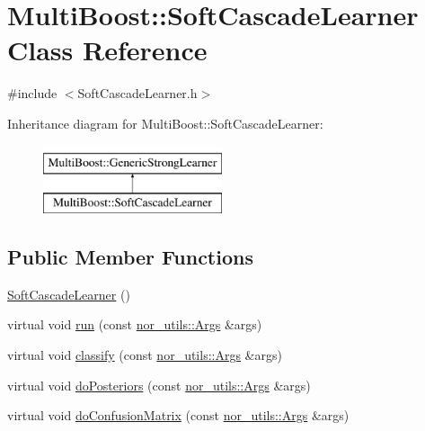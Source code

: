 \hypertarget{classMultiBoost_1_1SoftCascadeLearner}{\section{Multi\-Boost\-:\-:Soft\-Cascade\-Learner Class Reference}
\label{classMultiBoost_1_1SoftCascadeLearner}
}


{\ttfamily \#include $<$Soft\-Cascade\-Learner.\-h$>$}

Inheritance diagram for Multi\-Boost\-:\-:Soft\-Cascade\-Learner\-:\begin{figure}[H]
\begin{center}
\leavevmode
\includegraphics[height=2.000000cm]{classMultiBoost_1_1SoftCascadeLearner}
\end{center}
\end{figure}
\subsection*{Public Member Functions}
\begin{DoxyCompactItemize}
\item 
\hyperlink{classMultiBoost_1_1SoftCascadeLearner_a5ca76868ff190a12fc3289d1882bcf2f}{Soft\-Cascade\-Learner} ()
\item 
virtual void \hyperlink{classMultiBoost_1_1SoftCascadeLearner_aa6fbd04fc8e89c0195c6d1c02d39e548}{run} (const \hyperlink{classnor__utils_1_1Args}{nor\-\_\-utils\-::\-Args} \&args)
\item 
virtual void \hyperlink{classMultiBoost_1_1SoftCascadeLearner_aa210e0de5f3418cbaaef54a869dd4a7d}{classify} (const \hyperlink{classnor__utils_1_1Args}{nor\-\_\-utils\-::\-Args} \&args)
\item 
virtual void \hyperlink{classMultiBoost_1_1SoftCascadeLearner_a7ea7b224b29f8e969446b6caf9f27cb2}{do\-Posteriors} (const \hyperlink{classnor__utils_1_1Args}{nor\-\_\-utils\-::\-Args} \&args)
\item 
virtual void \hyperlink{classMultiBoost_1_1SoftCascadeLearner_a694a947eb5192940889aa6f342909bc6}{do\-Confusion\-Matrix} (const \hyperlink{classnor__utils_1_1Args}{nor\-\_\-utils\-::\-Args} \&args)
\end{DoxyCompactItemize}
